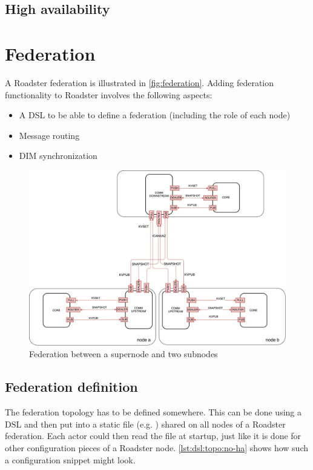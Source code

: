 \subsection{High availability}

\section{Federation}\label{sec:approach:federation}
A Roadster federation is illustrated in \autoref{fig:federation}. Adding federation
functionality to Roadster involves the following aspects:
\begin{itemize}
	\item A \gls{DSL} to be able to define a federation (including the role of each node)
	\item Message routing
	\item DIM synchronization
\end{itemize}

\begin{figure}[]
	\includegraphics[width=\textwidth]{img/federation_protocol.pdf}
	\caption{Federation between a supernode and two subnodes}
	\label{fig:federation}
\end{figure}

\subsection{Federation definition}
The federation topology has to be defined somewhere. This can be done using a
\gls{DSL} and then put into a static file (e.g. ) shared
on all nodes of a Roadster federation. Each actor could then read the file at
startup, just like it is done for other configuration pieces of a Roadster node.
\autoref{lst:dsl:topo:no-ha} shows how such a configuration snippet might look.

